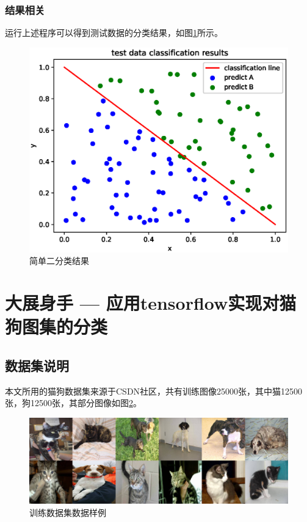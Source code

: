 \documentclass[a4paper,11pt]{ctexart}
\theoremstyle{break}
\theoremstyle{plain}
\begin{document}
\subsubsection{结果相关}
运行上述程序可以得到测试数据的分类结果，如图\ref{fig:class_result}所示。
\begin{figure}[h]
	\centering
	\includegraphics[scale=0.8]{sample_class.eps}
	\caption{简单二分类结果\label{fig:class_result}}
\end{figure}
\section{大展身手 --- 应用tensorflow实现对猫狗图集的分类}
\subsection{数据集说明}
本文所用的猫狗数据集来源于CSDN社区，共有训练图像25000张，其中猫12500张，狗12500张，其部分图像如图\ref{fig:simple_figure}。
\begin{figure}[h]
\centering
\includegraphics[scale=0.5]{final.eps}	
\caption{训练数据集数据样例\label{fig:simple_figure}}
\end{figure}
\end{document}
